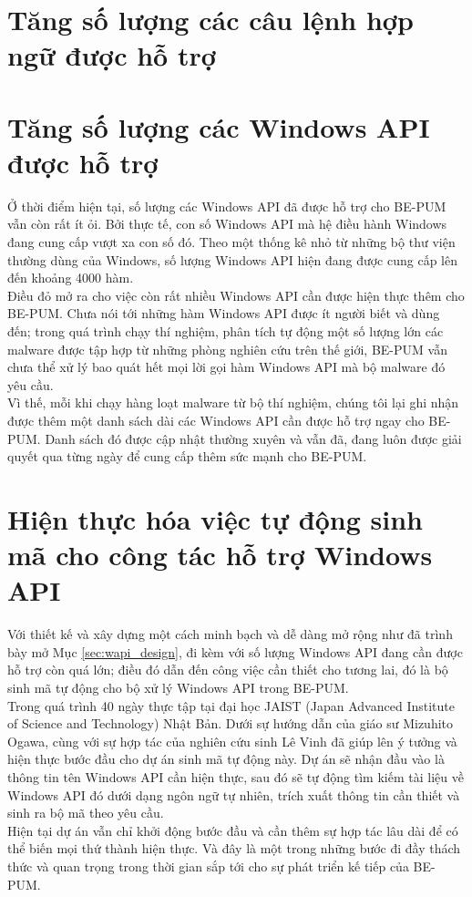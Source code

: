 \section{Tăng số lượng các câu lệnh hợp ngữ được hỗ trợ}

\section{Tăng số lượng các Windows API được hỗ trợ}

Ở thời điểm hiện tại, số lượng các Windows API đã được hỗ trợ cho BE-PUM vẫn còn rất ít ỏi. Bởi thực tế, con số Windows API mà hệ điều hành Windows đang cung cấp vượt xa con số đó. Theo một thống kê nhỏ từ những bộ thư viện thường dùng của Windows, số lượng Windows API hiện đang được cung cấp lên đến khoảng 4000 hàm.\\

Điều đỏ mở ra cho việc còn rất nhiều Windows API cần được hiện thực thêm cho BE-PUM. Chưa nói tới những hàm Windows API được ít người biết và dùng đến; trong quá trình chạy thí nghiệm, phân tích tự động một số lượng lớn các malware được tập hợp từ những phòng nghiên cứu trên thế giới, BE-PUM vẫn chưa thể xử lý bao quát hết mọi lời gọi hàm Windows API mà bộ malware đó yêu cầu.\\

Vì thế, mỗi khi chạy hàng loạt malware từ bộ thí nghiệm, chúng tôi lại ghi nhận được thêm một danh sách dài các Windows API cần được hỗ trợ ngay cho BE-PUM. Danh sách đó được cập nhật thường xuyên và vẫn đã, đang luôn được giải quyết qua từng ngày để cung cấp thêm sức mạnh cho BE-PUM.

\section{Hiện thực hóa việc tự động sinh mã cho công tác hỗ trợ Windows API}

Với thiết kế và xây dựng một cách minh bạch và dễ dàng mở rộng như đã trình bày mở Mục \ref{sec:wapi_design}, đi kèm với số lượng Windows API đang cần được hỗ trợ còn quá lớn; điều đó dẫn đến công việc cần thiết cho tương lai, đó là bộ sinh mã tự động cho bộ xử lý Windows API trong BE-PUM.\\

Trong quá trình 40 ngày thực tập tại đại học JAIST (Japan Advanced Institute of Science and Technology) Nhật Bản. Dưới sự hướng dẫn của giáo sư Mizuhito Ogawa, cùng với sự hợp tác của nghiên cứu sinh Lê Vinh đã giúp lên ý tưởng và hiện thực bước đầu cho dự án sinh mã tự động này. Dự án sẽ nhận đầu vào là thông tin tên Windows API cần hiện thực, sau đó sẽ tự động tìm kiếm tài liệu về Windows API đó dưới dạng ngôn ngữ tự nhiên, trích xuất thông tin cần thiết và sinh ra bộ mã theo yêu cầu.\\

Hiện tại dự án vẫn chỉ khởi động bước đầu và cần thêm sự hợp tác lâu dài để có thể biến mọi thứ thành hiện thực. Và đây là một trong những bước đi đầy thách thức và quan trọng trong thời gian sắp tới cho sự phát triển kế tiếp của BE-PUM.
